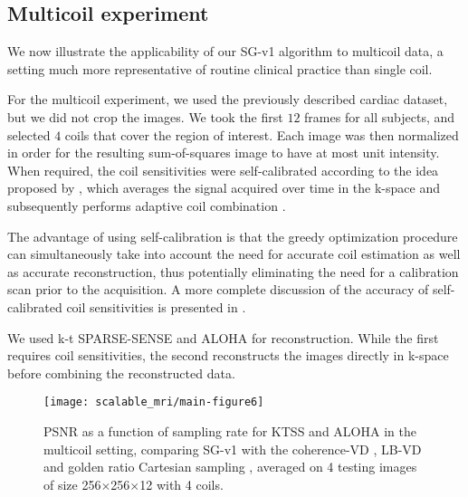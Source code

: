 \subsection{Multicoil experiment}
We now illustrate the applicability of our SG-v1 algorithm to multicoil data, a setting much more representative of routine clinical practice than single coil.

For the multicoil experiment, we used the previously described cardiac dataset, but we did not crop the images. We took the first $12$ frames for all subjects, and selected $4$ coils that cover the region of interest. Each image was then normalized in order for the resulting sum-of-squares image to have at most unit intensity.  When required, the coil sensitivities were self-calibrated according to the idea proposed by \citet{feng2013highly}, which averages the signal acquired over time in the k-space and subsequently performs adaptive coil combination \citep{walsh2000adaptive,griswold2002use}.

The advantage of using self-calibration is that the greedy optimization procedure can simultaneously take into account the need for accurate coil estimation as well as accurate reconstruction, thus potentially eliminating the need for a calibration scan prior to the acquisition. A more complete discussion of the accuracy of self-calibrated coil sensitivities is presented in \citet{feng2013highly}.

We used k-t SPARSE-SENSE \citep{otazo2010combination} and ALOHA \citep{jin2016general} for reconstruction. While the first requires coil sensitivities, the second reconstructs the images directly in k-space before combining the reconstructed data. 
\begin{figure}[!t]
    \centering
    \texttt{[image: scalable\_mri/main-figure6]}
    \caption{PSNR as a function of sampling rate for KTSS \protect\citep{otazo2010combination} and ALOHA \citep{jin2016general} in the multicoil setting, comparing SG-v1 with the coherence-VD \citep{lustig2007sparse}, LB-VD  and golden ratio Cartesian sampling \protect\citep{li2018dynamic}, averaged on 4 testing images of size 256$\times$256$\times$12 with 4 coils. }\label{fig:psnr_multi}
\end{figure}




